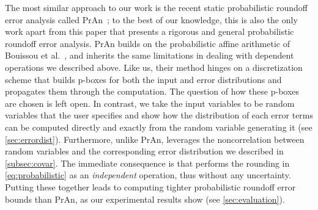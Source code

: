 The most similar approach to our work is the recent static probabilistic
roundoff error analysis called PrAn~\cite{probdaisy}; to the best of our
knowledge, this is also the only work apart from this paper that presents a
rigorous and general probabilistic roundoff error analysis.
%
PrAn builds on the probabilistic affine arithmetic of Bouissou et
al.~\cite{bouissou2012generalization}, and inherits the same limitations in
dealing with dependent operations we described above. 
%
%
Like us, their method hinges on a discretization scheme that builds
p-boxes for both the input and error distributions and propagates them through
the computation.
%
The question of how these p-boxes are chosen
is left open.  In contrast,  we take the input variables to be
random variables that the user specifies and show how the distribution of
each error terms can be computed directly and exactly from the random variable
generating it (see \cref{sec:errordist}).
%
%
%
%
Furthermore, unlike PrAn, \Tool leverages the noncorrelation between random variables and the corresponding error distribution we described in \cref{subsec:covar}.
%
The immediate consequence is that \Tool performs the rounding in \cref{eq:probabilistic} as an \emph{independent} operation, thus without any uncertainty.
%
%
Putting these together leads to \Tool computing tighter probabilistic roundoff
error bounds than PrAn, as our experimental results show (see
\cref{sec:evaluation}).

